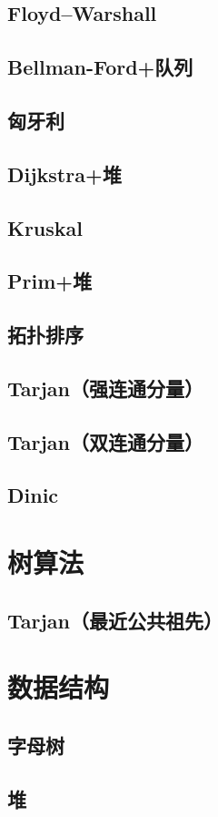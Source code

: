 \documentclass[a4paper]{article}
\begin{document}
\subsection{Floyd–Warshall}
\subsection{Bellman-Ford+队列}
\subsection{匈牙利}
\subsection{Dijkstra+堆}
\subsection{Kruskal}
\subsection{Prim+堆}
\subsection{拓扑排序}
\subsection{Tarjan（强连通分量）}
\subsection{Tarjan（双连通分量）}
\subsection{Dinic}
\section{树算法}
\subsection{Tarjan（最近公共祖先）}
\section{数据结构}
\subsection{字母树}
\subsection{堆}
\end{document}
